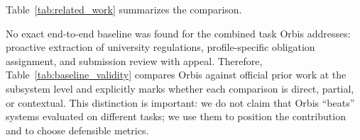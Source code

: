 \documentclass[a4paper,12pt]{article}
\begin{document}
Table~\ref{tab:related_work} summarizes the comparison.

\begin{table}[H]
\centering
\small
{}
\caption[Positioning of Orbis Against Related Systems]{Positioning of Orbis against related categories of academic-support systems. \emph{Push} means the system surfaces an obligation before a student asks. \emph{Unstructured rules} means handling free-text regulation, not only schema-based requirements.}
\label{tab:related_work}
\end{table}

No exact end-to-end baseline was found for the combined task Orbis addresses: proactive extraction of university regulations, profile-specific obligation assignment, and submission review with appeal. Therefore, Table~\ref{tab:baseline_validity} compares Orbis against official prior work at the subsystem level and explicitly marks whether each comparison is direct, partial, or contextual. This distinction is important: we do not claim that Orbis ``beats'' systems evaluated on different tasks; we use them to position the contribution and to choose defensible metrics.
\end{document}
